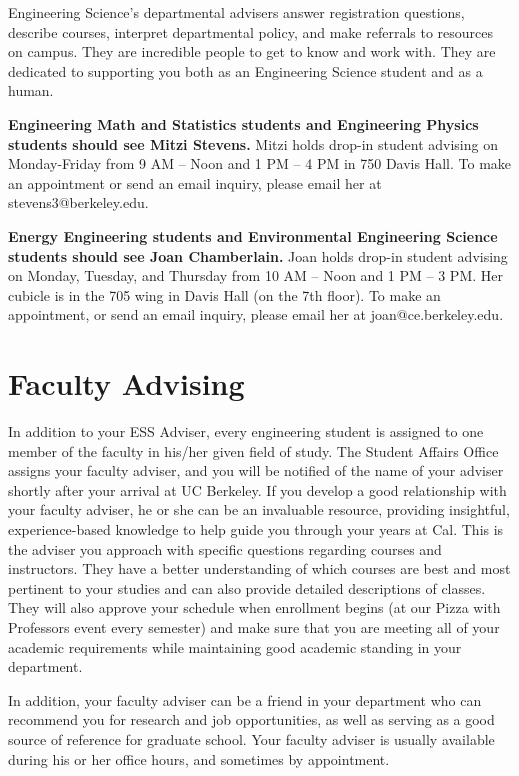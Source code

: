 Engineering Science’s departmental advisers answer registration questions, describe courses, interpret departmental policy, and make referrals to resources on campus. They are incredible people to get to know and work with. They are dedicated to supporting you both as an Engineering Science student and as a human.

\textbf{Engineering Math and Statistics students and Engineering Physics students should see Mitzi Stevens.} Mitzi holds drop-in student advising on Monday-Friday from 9 AM – Noon and 1 PM – 4 PM in 750 Davis Hall. To make an appointment or send an email inquiry, please email her at {\selectfont stevens3@berkeley.edu}.

\textbf{Energy Engineering students and Environmental Engineering Science students should see Joan Chamberlain.} Joan holds drop-in student advising on Monday, Tuesday, and Thursday from 10 AM – Noon and 1 PM – 3 PM. Her cubicle is in the 705 wing in Davis Hall (on the 7th floor). To make an appointment, or send an email inquiry, please email her at {\selectfont joan@ce.berkeley.edu}.

\section*{Faculty Advising}

In addition to your ESS Adviser, every engineering student is assigned to one member of the faculty in his/her given field of study. The Student Affairs Office assigns your faculty adviser, and you will be notified of the name of your adviser shortly after your arrival at UC Berkeley. If you develop a good relationship with your faculty adviser, he or she can be an invaluable resource, providing insightful, experience-based knowledge to help guide you through your years at Cal. This is the adviser you approach with specific questions regarding courses and instructors. They have a better understanding of which courses are best and most pertinent to your studies and can also provide detailed descriptions of classes. They will also approve your schedule when enrollment begins (at our Pizza with Professors event every semester) and make sure that you are meeting all of your academic requirements while maintaining good academic standing in your department.

In addition, your faculty adviser can be a friend in your department who can recommend you for research and job opportunities, as well as serving as a good source of reference for graduate school. Your faculty adviser is usually available during his or her office hours, and sometimes by appointment.

